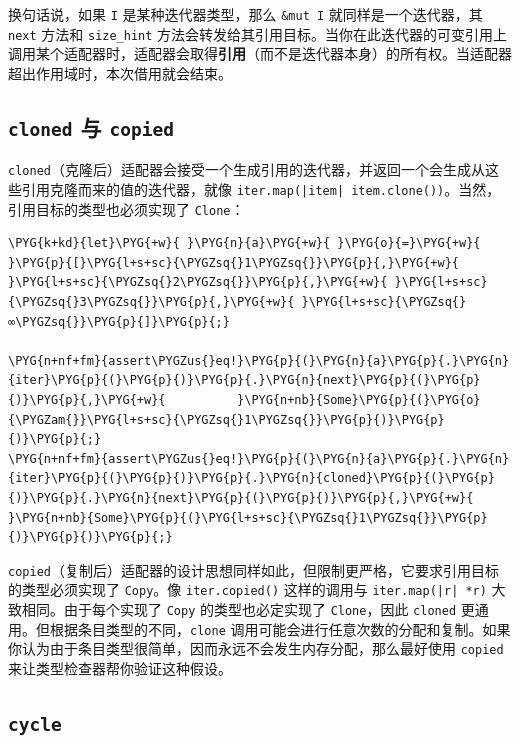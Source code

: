 换句话说，如果 \texttt{I} 是某种迭代器类型，那么 \texttt{\&mut I} 就同样是一个迭代器，其 \texttt{next} 方法和 \texttt{size\_hint} 方法会转发给其引用目标。当你在此迭代器的可变引用上调用某个适配器时，适配器会取得\textbf{引用}（而不是迭代器本身）的所有权。当适配器超出作用域时，本次借用就会结束。

\subsection{\texttt{cloned} 与 \texttt{copied}}

\texttt{cloned}（克隆后）适配器会接受一个生成引用的迭代器，并返回一个会生成从这些引用克隆而来的值的迭代器，就像 \texttt{iter.map(|item| item.clone())}。当然，引用目标的类型也必须实现了 \texttt{Clone}：

\begin{Verbatim}[commandchars=\\\{\},breaklines=true,breakanywhere=true,fontsize=\codefont,xleftmargin=17bp]
\PYG{k+kd}{let}\PYG{+w}{ }\PYG{n}{a}\PYG{+w}{ }\PYG{o}{=}\PYG{+w}{ }\PYG{p}{[}\PYG{l+s+sc}{\PYGZsq{}1\PYGZsq{}}\PYG{p}{,}\PYG{+w}{ }\PYG{l+s+sc}{\PYGZsq{}2\PYGZsq{}}\PYG{p}{,}\PYG{+w}{ }\PYG{l+s+sc}{\PYGZsq{}3\PYGZsq{}}\PYG{p}{,}\PYG{+w}{ }\PYG{l+s+sc}{\PYGZsq{}∞\PYGZsq{}}\PYG{p}{]}\PYG{p}{;}

\PYG{n+nf+fm}{assert\PYGZus{}eq!}\PYG{p}{(}\PYG{n}{a}\PYG{p}{.}\PYG{n}{iter}\PYG{p}{(}\PYG{p}{)}\PYG{p}{.}\PYG{n}{next}\PYG{p}{(}\PYG{p}{)}\PYG{p}{,}\PYG{+w}{          }\PYG{n+nb}{Some}\PYG{p}{(}\PYG{o}{\PYGZam{}}\PYG{l+s+sc}{\PYGZsq{}1\PYGZsq{}}\PYG{p}{)}\PYG{p}{)}\PYG{p}{;}
\PYG{n+nf+fm}{assert\PYGZus{}eq!}\PYG{p}{(}\PYG{n}{a}\PYG{p}{.}\PYG{n}{iter}\PYG{p}{(}\PYG{p}{)}\PYG{p}{.}\PYG{n}{cloned}\PYG{p}{(}\PYG{p}{)}\PYG{p}{.}\PYG{n}{next}\PYG{p}{(}\PYG{p}{)}\PYG{p}{,}\PYG{+w}{ }\PYG{n+nb}{Some}\PYG{p}{(}\PYG{l+s+sc}{\PYGZsq{}1\PYGZsq{}}\PYG{p}{)}\PYG{p}{)}\PYG{p}{;}
\end{Verbatim}

\texttt{copied}（复制后）适配器的设计思想同样如此，但限制更严格，它要求引用目标的类型必须实现了 \texttt{Copy}。像 \texttt{iter.copied()} 这样的调用与 \texttt{iter.map(|r| *r)} 大致相同。由于每个实现了 \texttt{Copy} 的类型也必定实现了 \texttt{Clone}，因此 \texttt{cloned} 更通用。但根据条目类型的不同，\texttt{clone} 调用可能会进行任意次数的分配和复制。如果你认为由于条目类型很简单，因而永远不会发生内存分配，那么最好使用 \texttt{copied} 来让类型检查器帮你验证这种假设。

\subsection{\texttt{cycle}}

